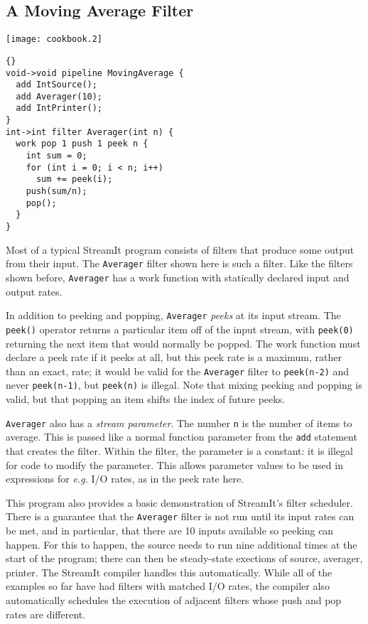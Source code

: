 \subsection{A Moving Average Filter}

\begin{textpic}{\texttt{[image: cookbook.2]}}
\begin{lstlisting}{}
void->void pipeline MovingAverage {
  add IntSource();
  add Averager(10);
  add IntPrinter();
}
int->int filter Averager(int n) {
  work pop 1 push 1 peek n {
    int sum = 0;
    for (int i = 0; i < n; i++)
      sum += peek(i);
    push(sum/n);
    pop();
  }
}
\end{lstlisting}
\end{textpic}

Most of a typical StreamIt program consists of filters that produce
some output from their input.  The \lstinline|Averager| filter shown
here is such a filter.  Like the filters shown before,
\lstinline|Averager| has a work function with statically declared
input and output rates.

In addition to peeking and popping, \lstinline|Averager| \emph{peeks}
at its input stream.  The \lstinline|peek()| operator returns a
particular item off of the input stream, with \lstinline|peek(0)|
returning the next item that would normally be popped.  The work
function must declare a peek rate if it peeks at all, but this peek
rate is a maximum, rather than an exact, rate; it would be valid for
the \lstinline|Averager| filter to \lstinline|peek(n-2)| and never
\lstinline|peek(n-1)|, but \lstinline|peek(n)| is illegal.  Note that
mixing peeking and popping is valid, but that popping an item shifts
the index of future peeks.

\lstinline|Averager| also has a \emph{stream parameter}.  The number
\lstinline|n| is the number of items to average.  This is passed like
a normal function parameter from the \lstinline|add| statement that
creates the filter.  Within the filter, the parameter is a constant:
it is illegal for code to modify the parameter.  This allows parameter
values to be used in expressions for \emph{e.g.} I/O rates, as in the
peek rate here.

This program also provides a basic demonstration of StreamIt's filter
scheduler.  There is a guarantee that the \lstinline|Averager| filter
is not run until its input rates can be met, and in particular, that
there are 10 inputs available so peeking can happen.  For this to
happen, the source needs to run nine additional times at the start of
the program; there can then be steady-state exections of source,
averager, printer.  The StreamIt compiler handles this automatically.
While all of the examples so far have had filters with matched I/O
rates, the compiler also automatically schedules the execution of
adjacent filters whose push and pop rates are different.

